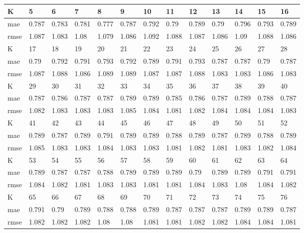 \begin{appendices}
\begin{center} 
	\begin{tabularx}{\textwidth}{|l|X|X|X|X|X|X|X|X|X|X|X|X|} 
		\hline 
		K & 5 & 6 & 7 & 8 & 9 & 10 & 11 & 12 & 13 & 14 & 15 & 16 \\ \hline 
		mae & 0.787 & 0.783 & 0.781 & 0.777 & 0.787 & 0.792 & 0.79 & 0.789 & 0.79 & 0.796 & 0.793 & 0.789 \\ \hline 
		rmse & 1.087 & 1.083 & 1.08 & 1.079 & 1.086 & 1.092 & 1.088 & 1.087 & 1.086 & 1.09 & 1.088 & 1.086 \\ \hline 
		\hline 
		K & 17 & 18 & 19 & 20 & 21 & 22 & 23 & 24 & 25 & 26 & 27 & 28 \\ \hline 
		mae & 0.79 & 0.792 & 0.791 & 0.793 & 0.792 & 0.789 & 0.791 & 0.793 & 0.787 & 0.787 & 0.79 & 0.787 \\ \hline 
		rmse & 1.087 & 1.088 & 1.086 & 1.089 & 1.089 & 1.087 & 1.087 & 1.088 & 1.083 & 1.083 & 1.086 & 1.083 \\ \hline 
		\hline 
		K & 29 & 30 & 31 & 32 & 33 & 34 & 35 & 36 & 37 & 38 & 39 & 40 \\ \hline 
		mae & 0.787 & 0.786 & 0.787 & 0.787 & 0.789 & 0.789 & 0.785 & 0.786 & 0.787 & 0.789 & 0.788 & 0.787 \\ \hline 
		rmse & 1.082 & 1.083 & 1.083 & 1.083 & 1.085 & 1.084 & 1.081 & 1.082 & 1.084 & 1.084 & 1.084 & 1.083 \\ \hline 
		\hline 
		K & 41 & 42 & 43 & 44 & 45 & 46 & 47 & 48 & 49 & 50 & 51 & 52 \\ \hline 
		mae & 0.789 & 0.787 & 0.789 & 0.791 & 0.789 & 0.789 & 0.788 & 0.789 & 0.787 & 0.789 & 0.788 & 0.789 \\ \hline 
		rmse & 1.085 & 1.083 & 1.083 & 1.084 & 1.083 & 1.083 & 1.081 & 1.082 & 1.081 & 1.083 & 1.082 & 1.084 \\ \hline 
		\hline 
		K & 53 & 54 & 55 & 56 & 57 & 58 & 59 & 60 & 61 & 62 & 63 & 64 \\ \hline 
		mae & 0.789 & 0.787 & 0.787 & 0.788 & 0.789 & 0.789 & 0.789 & 0.79 & 0.789 & 0.789 & 0.791 & 0.791 \\ \hline 
		rmse & 1.084 & 1.082 & 1.081 & 1.083 & 1.083 & 1.081 & 1.081 & 1.084 & 1.083 & 1.08 & 1.084 & 1.082 \\ \hline 
		\hline 
		K & 65 & 66 & 67 & 68 & 69 & 70 & 71 & 72 & 73 & 74 & 75 & 76 \\ \hline 
		mae & 0.791 & 0.79 & 0.789 & 0.788 & 0.788 & 0.789 & 0.787 & 0.787 & 0.787 & 0.789 & 0.789 & 0.787 \\ \hline 
		rmse & 1.082 & 1.082 & 1.082 & 1.08 & 1.08 & 1.081 & 1.081 & 1.082 & 1.082 & 1.084 & 1.084 & 1.081 \\ \hline 

\end{tabularx}
\end{center}
\end{appendices}
